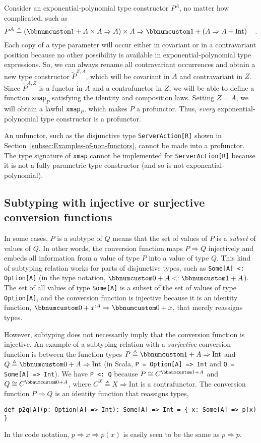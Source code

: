 Consider an exponential-polynomial type constructor $P^{A}$, no matter
how complicated, such as
\[
P^{A}\triangleq\left(\bbnum 1+A\times A\Rightarrow A\right)\times A\Rightarrow\bbnum 1+\left(A\Rightarrow A+\text{Int}\right)\quad.
\]
Each copy of a type parameter will occur either in covariant or in
a contravariant position because no other possibility is available
in exponential-polynomial type expressions. So, we can always rename
all contravariant occurrences and obtain a new type constructor $\tilde{P}^{Z,A}$,
which will be covariant in $A$ and contravariant in $Z$. Since $\tilde{P}^{A,Z}$
is a functor in $A$ and a contrafunctor in $Z$, we will be able
to define a function \lstinline!xmap!$_{\tilde{P}}$ satisfying the
identity and composition laws. Setting $Z=A$, we will obtain a lawful
\lstinline!xmap!$_{P}$, which makes $P$ a profunctor. Thus, \emph{every}
exponential-polynomial type constructor is a profunctor.

An unfunctor, such as the disjunctive type \lstinline!ServerAction[R]!
shown in Section~\ref{subsec:Examples-of-non-functors}, cannot be
made into a profunctor. The type signature of \lstinline!xmap! cannot
be implemented for \lstinline!ServerAction[R]! because it is not
a fully parametric type constructor (and so is not exponential-polynomial).

\subsection{Subtyping with injective or surjective conversion functions}

In some cases, $P$ is a subtype of $Q$ means that the set of values
of $P$ is a \emph{subset} of values of $Q$. In other words, the
conversion function maps $P\Rightarrow Q$ injectively and embeds
all information from a value of type $P$ into a value of type $Q$.
This kind of subtyping relation works for parts of disjunctive types,
such as \lstinline!Some[A] <: Option[A]! (in the type notation, $\bbnum 0+A<:\bbnum 1+A$).
The set of all values of type \lstinline!Some[A]! is a subset of
the set of values of type \lstinline!Option[A]!, and the conversion
function is injective because it is an identity function, $\bbnum 0+x^{:A}\Rightarrow\bbnum 0+x$,
that merely reassigns types.

However, subtyping does not necessarily imply that the conversion
function is injective. An example of a subtyping relation with a \emph{surjective}
conversion function is between the function types $P\triangleq\bbnum 1+A\Rightarrow\text{Int}$
and $Q\triangleq\bbnum 0+A\Rightarrow\text{Int}$ (in Scala, \lstinline!P = Option[A] => Int!
and \lstinline!Q = Some[A] => Int!). We have \lstinline!P <: Q!
because $P\cong C^{\bbnum 1+A}$ and $Q\cong C^{\bbnum 0+A}$, where
$C^{X}\triangleq X\Rightarrow\text{Int}$ is a contrafunctor. The
conversion function $P\Rightarrow Q$ is an identity function that
reassigns types,
\begin{lstlisting}
def p2q[A](p: Option[A] => Int): Some[A] => Int = { x: Some[A] => p(x) }
\end{lstlisting}
In the code notation, $p\Rightarrow x\Rightarrow p(x)$ is easily
seen to be the same as $p\Rightarrow p$. 

